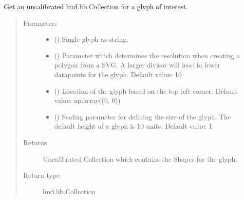\documentclass[a4paper,10pt,english,openany,oneside]{sphinxmanual}
\begin{document}
\begin{fulllineitems}
\label{\detokenize{pages/modules:lmd.tools.glyph}}
\sphinxAtStartPar
Get an uncalibrated lmd.lib.Collection for a glyph of interest.
\begin{quote}\begin{description}
\item[{Parameters}] \leavevmode\begin{itemize}
\item {} 
\sphinxAtStartPar
{} () \textendash{} Single glyph as string.

\item {} 
\sphinxAtStartPar
{} () \textendash{} Parameter which determines the resolution when creating a polygon from a SVG. A larger divisor will lead to fewer datapoints for the glyph. Default value: 10

\item {} 
\sphinxAtStartPar
{} () \textendash{} Location of the glyph based on the top left corner. Default value: np.array((0, 0))

\item {} 
\sphinxAtStartPar
{} () \textendash{} Scaling parameter for defining the size of the glyph. The default height of a glyph is 10 units. Default value: 1

\end{itemize}

\item[{Returns}] \leavevmode
\sphinxAtStartPar
Uncalibrated Collection which contains the Shapes for the glyph.

\item[{Return type}] \leavevmode
\sphinxAtStartPar
lmd.lib.Collection

\end{description}\end{quote}

\end{fulllineitems}
\end{document}

